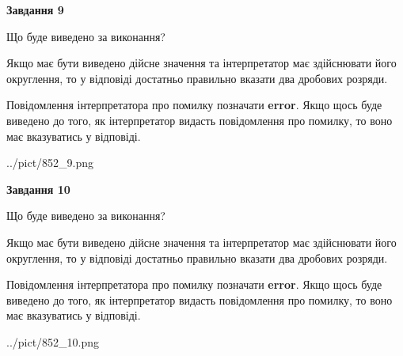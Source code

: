 \documentclass[12pt, ukrainian]{article}
\begin{document}
{\begin {Large}
{\begin {center}\textbf{Завдання 9}\end {center}}\par
Що буде виведено за виконання? \par

Якщо має бути виведено дійсне значення та інтерпретатор має здійснювати його округлення, 
то у відповіді достатньо правильно вказати два дробових розряди.

Повідомлення інтерпретатора про помилку позначати \textbf{error}.
Якщо щось буде виведено до того, як інтерпретатор видасть повідомлення про помилку, 
то воно має вказуватись у відповіді. \par

\begin{center}
	{../pict/852_9.png}
\end{center}
\newpage

{\begin {center}\textbf{Завдання 10}\end {center}}\par
Що буде виведено за виконання? \par

Якщо має бути виведено дійсне значення та інтерпретатор має здійснювати його округлення, 
то у відповіді достатньо правильно вказати два дробових розряди.

Повідомлення інтерпретатора про помилку позначати \textbf{error}.
Якщо щось буде виведено до того, як інтерпретатор видасть повідомлення про помилку, 
то воно має вказуватись у відповіді. \par

\begin{center}
	{../pict/852_10.png}
\end{center}
\newpage

\end {Large}}
\end{document}
